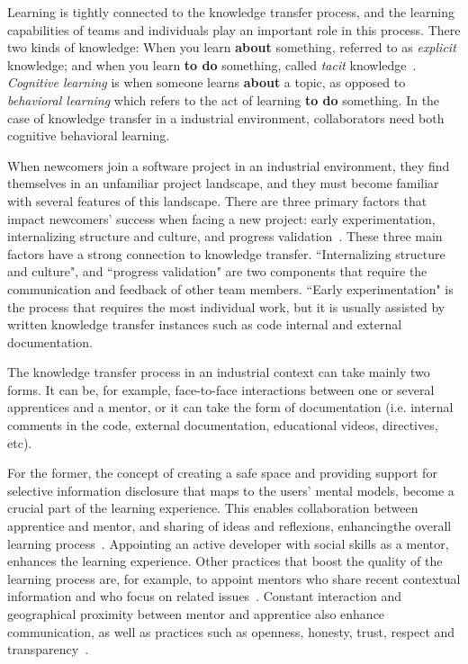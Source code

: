 \documentclass[12pt, letterpaper]{article}
\begin{document}
Learning is tightly connected to the knowledge transfer
process, and the learning capabilities of teams and individuals play an important role in 
this process.
There two kinds of knowledge: When you learn \textbf{about} something, referred to as \textit{explicit} 
knowledge; and when you learn \textbf{to do} something, called \textit{tacit} knowledge~\cite{cook99}. 
\textit{Cognitive learning} is when someone learns \textbf{about} a topic, as opposed to 
\textit{behavioral learning} which refers to the act of learning \textbf{to do} something.
In the case of knowledge transfer in a industrial environment, collaborators need both cognitive
behavioral learning.

When newcomers join a software project in an industrial environment, they find themselves in an
unfamiliar project
landscape, and they must become familiar with several features of this landscape.
There are three primary factors that impact newcomers'
success when facing a new project: early experimentation, internalizing structure
and culture, and progress validation~\cite{Dagenais10}. These three main factors
have a strong connection to knowledge transfer. ``Internalizing structure and culture", and 
``progress validation" are two components that require the communication and feedback 
of other team members. ``Early experimentation" is the process that requires the most 
individual work, but it is usually assisted by written knowledge transfer instances
such as code internal and external documentation.

The knowledge transfer process in an industrial context can take mainly two forms. It can be, for example,
face-to-face interactions between one or several apprentices and a mentor, or it can take the form of documentation 
(i.e. internal comments in the code, external documentation, educational videos, directives, etc). 

For the 
former, the concept of creating a safe space and providing support for selective information disclosure that
maps to the users' mental models, become a crucial part of the learning
experience. This enables collaboration between apprentice and mentor, and sharing of ideas and reflexions, 
enhancingthe overall learning process~\cite{Razavi06}. Appointing an active developer with social skills
as a mentor, enhances the learning experience. Other practices that boost the quality 
of the learning process are, for example, to appoint mentors who share recent
contextual information and who focus on related issues~\cite{Steinmacher12}. Constant interaction
and geographical proximity between mentor and apprentice also enhance communication, as well as 
practices such as openness, honesty, trust, respect and transparency~\cite{Whitworth06}. 
\end{document}
